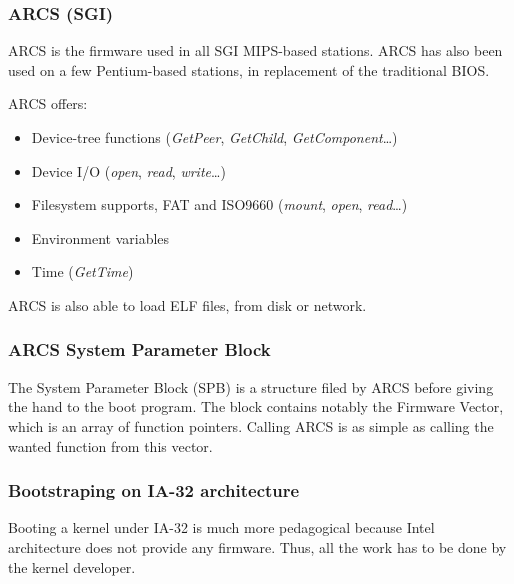 \begin{frame}
  \frametitle{ARCS (SGI)}

  ARCS is the firmware used in all SGI MIPS-based stations. ARCS has
  also been used on a few Pentium-based stations, in replacement of
  the traditional BIOS.

  \-

  ARCS offers:

  \begin{itemize}
  \item
    Device-tree functions (\emph{GetPeer}, \emph{GetChild},
    \emph{GetComponent}\ldots)
  \item
    Device I/O (\emph{open}, \emph{read}, \emph{write}\ldots)
  \item
    Filesystem supports, FAT and ISO9660 (\emph{mount}, \emph{open},
    \emph{read}\ldots)
  \item
    Environment variables
  \item
    Time (\emph{GetTime})
  \end{itemize}

  \-

  ARCS is also able to load ELF files, from disk or network.

\end{frame}


\begin{frame}
  \frametitle{ARCS System Parameter Block}

  The System Parameter Block (SPB) is a structure filed by ARCS before
  giving the hand to the boot program. The block contains notably the
  Firmware Vector, which is an array of function pointers. Calling
  ARCS is as simple as calling the wanted function from this vector.

\end{frame}

%
%
%

\begin{frame}
  \frametitle{Bootstraping on IA-32 architecture}

  Booting a kernel under IA-32 is much more pedagogical because Intel architecture does not provide any firmware. Thus, all the work has to be done by the kernel developer.

\end{frame}

%
%
%

